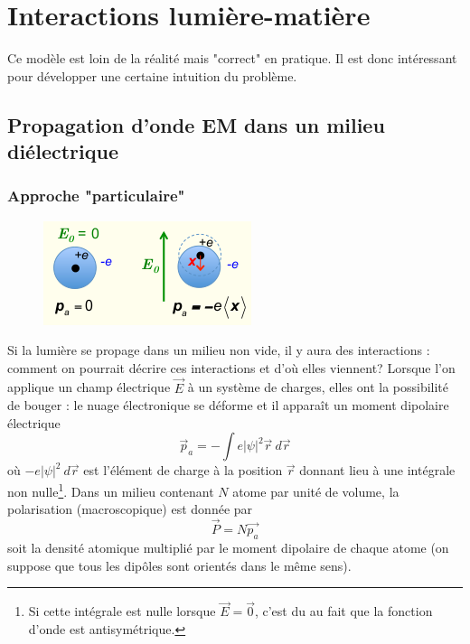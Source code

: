 \chapter{Interactions lumière-matière}
Ce modèle est loin de la réalité mais "correct" en pratique. Il est donc intéressant pour développer une 
certaine intuition du problème.

	\section{Propagation d'onde EM dans un milieu diélectrique}
	\subsection{Approche "particulaire"}
	\begin{figure}
	\vspace{-5mm}
	\includegraphics[scale=0.65]{ch2/image1.png}
	\end{figure}
	Si la lumière se propage dans un milieu non vide, il y aura des interactions : comment on pourrait décrire 
	ces interactions et d'où elles viennent? Lorsque l'on applique un champ électrique $\vec{E}$ à un système de
	charges, elles ont la possibilité de bouger : le nuage électronique se déforme et il apparaît un moment 
	dipolaire électrique
	\begin{equation}
	\vec{p}_a = -\int e|\psi|^2\vec{r}\ d\vec{r}
	\end{equation}
	où $-e|\psi|^2\ d\vec{r}$ est l'élément de charge à la position $\vec{r}$ donnant lieu à une intégrale 
	non nulle\footnote{Si cette intégrale est nulle lorsque $\vec{E}=\vec{0}$, c'est du au fait que la fonction 
	d'onde est antisymétrique.}. Dans un milieu contenant $N$ atome par unité de volume, la polarisation 
	(macroscopique) est donnée par
	\begin{equation}
	\vec P = N\vec{p_a}
	\end{equation}
	soit la densité atomique multiplié par le moment dipolaire de chaque atome (on suppose que tous les dipôles
	sont orientés dans le même sens).\\
	
